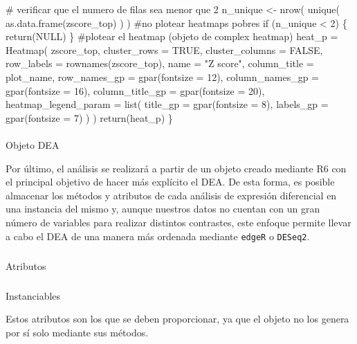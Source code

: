 \documentclass[
  10pt,
]{article}
\makeatletter
\let\oldparagraph\paragraph
\renewcommand{\paragraph}{
    \@ifstar
      \xxxParagraphStar
      \xxxParagraphNoStar
  }
\newcommand{\xxxParagraphStar}[1]{\oldparagraph*{#1}\mbox{}}
\newcommand{\xxxParagraphNoStar}[1]{\oldparagraph{#1}\mbox{}}
\let\oldsubparagraph\subparagraph
\renewcommand{\subparagraph}{
    \@ifstar
      \xxxSubParagraphStar
      \xxxSubParagraphNoStar
  }
\newcommand{\xxxSubParagraphStar}[1]{\oldsubparagraph*{#1}\mbox{}}
\newcommand{\xxxSubParagraphNoStar}[1]{\oldsubparagraph{#1}\mbox{}}
\newenvironment{Shaded}{\begin{snugshade}}{\end{snugshade}}
\newcommand{\NormalTok}[1]{\textcolor[rgb]{0.00,0.23,0.31}{#1}}
\makeatother
\begin{document}
\begin{Shaded}
\begin{Highlighting}[]
\NormalTok{  \# verificar que el numero de filas sea menor que 2}
\NormalTok{  n\_unique \textless{}{-} nrow(}
\NormalTok{    unique(}
\NormalTok{      as.data.frame(zscore\_top)}
\NormalTok{    )}
\NormalTok{  )}
\NormalTok{  \#no plotear heatmaps pobres}
\NormalTok{  if (n\_unique \textless{} 2) \{}
\NormalTok{    return(NULL)}
\NormalTok{  \}}
\NormalTok{  \#plotear el heatmap (objeto de complex heatmap)}
\NormalTok{  heat\_p = Heatmap(}
\NormalTok{    zscore\_top,}
\NormalTok{    cluster\_rows = TRUE,}
\NormalTok{    cluster\_columns = FALSE,}
\NormalTok{    row\_labels = rownames(zscore\_top),}
\NormalTok{    name = "Z score",}
\NormalTok{    column\_title = plot\_name,}
\NormalTok{    row\_names\_gp = gpar(fontsize = 12),}
\NormalTok{    column\_names\_gp = gpar(fontsize = 16),}
\NormalTok{    column\_title\_gp = gpar(fontsize = 20),}
\NormalTok{    heatmap\_legend\_param = list(}
\NormalTok{      title\_gp = gpar(fontsize = 8),}
\NormalTok{      labels\_gp = gpar(fontsize = 7)}
\NormalTok{    )}
\NormalTok{  )}
\NormalTok{  return(heat\_p)}
\NormalTok{\}}
\end{Highlighting}
\end{Shaded}

\paragraph{Objeto DEA}\label{objeto-dea}

Por último, el análisis se realizará a partir de un objeto creado
mediante R6 con el principal objetivo de hacer más explícito el DEA. De
esta forma, es posible almacenar los métodos y atributos de cada
análisis de expresión diferencial en una instancia del mismo y, aunque
nuestros datos no cuentan con un gran número de variables para realizar
distintos contrastes, este enfoque permite llevar a cabo el DEA de una
manera más ordenada mediante \texttt{edgeR} o \texttt{DESeq2}.

\subparagraph{Atributos}\label{atributos}

\subparagraph{Instanciables}\label{instanciables}

Estos atributos son los que se deben proporcionar, ya que el objeto no
los genera por sí solo mediante sus métodos.
\end{document}
